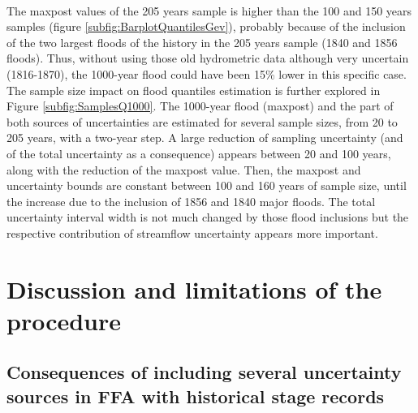 \documentclass[11pt]{article}
\begin{document}
        \paragraph{}
        The maxpost values of the 205 years sample is higher than the 100 and 150 years samples (figure \ref{subfig:BarplotQuantilesGev}), probably because of the inclusion of the two largest floods of the history in the 205 years sample (1840 and 1856 floods). Thus, without using those old hydrometric data although very uncertain (1816-1870), the 1000-year flood could have been 15\% lower in this specific case. The sample size impact on flood quantiles estimation is further explored in Figure \ref{subfig:SamplesQ1000}. The 1000-year flood (maxpost) and the part of both sources of uncertainties are estimated for several sample sizes, from 20 to 205 years, with a two-year step. A large reduction of sampling uncertainty (and of the total uncertainty as a consequence) appears between 20 and 100 years, along with the reduction of the maxpost value. Then, the maxpost and uncertainty bounds are constant between 100 and 160 years of sample size, until the increase due to the inclusion of 1856 and 1840 major floods. The total uncertainty interval width is not much changed by those flood inclusions but the respective contribution of streamflow uncertainty appears more important.
        
\section{Discussion and limitations of the procedure}

    \subsection{Consequences of including several uncertainty sources in FFA with historical stage records}
\end{document}
